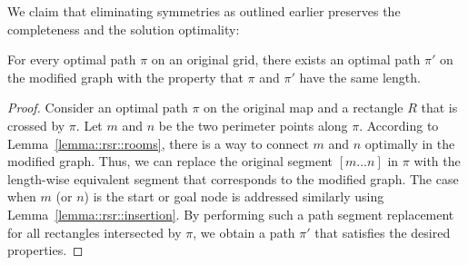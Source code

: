 We claim that eliminating symmetries as outlined earlier
preserves the completeness and the solution optimality:
\begin{theorem}
For every optimal path $\pi$ on an original grid, there exists an optimal path
$\pi'$ on the modified graph with the property that $\pi$ and $\pi'$ have the
same length.
\end{theorem}
\begin{proof}
Consider an optimal path $\pi$ on the original map and a rectangle $R$ that is
crossed by $\pi$.  Let $m$ and $n$ be the two perimeter points along $\pi$.
According to Lemma~\ref{lemma::rsr::rooms}, there is a way to connect $m$ and $n$
optimally in the modified graph. Thus, we can replace the original segment $[m
\dots n]$ in $\pi$ with the length-wise equivalent segment that corresponds to the
modified graph.  The case when $m$ (or $n$) is the start or goal node is
addressed similarly using Lemma~\ref{lemma::rsr::insertion}.  By performing such a
path segment replacement for all rectangles intersected by $\pi$, we obtain a
path $\pi'$ that satisfies the desired properties.
\end{proof}

